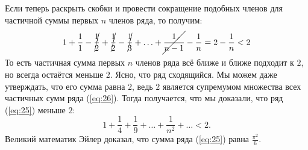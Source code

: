 \documentclass[12pt]{article}
\begin{document}
Если теперь раскрыть скобки и провести сокращение подобных членов для частичной суммы первых $n$ членов ряда, то получим:
\begin{equation}
    \begin{split}
        1 + \dfrac{1}{1} - \cancel{\dfrac{1}{2}} + \cancel{\dfrac{1}{2}}  - \cancel{\dfrac{1}{3}} + \ldots +\cancel{\dfrac{1}{n-1}} - \dfrac{1}{n} = 2 - \dfrac{1}{n} < 2
    \end{split}
\end{equation}
То есть частичная сумма первых $n$ членов ряда всё ближе и ближе подходит к $2$, но всегда остаётся меньше $2$. Ясно, что ряд сходящийся. Мы можем даже утверждать, что его сумма равна $2$, ведь $2$ является супремумом множества всех частичных сумм ряда (\ref{eq:26}). Тогда получается, что мы доказали, что ряд (\ref{eq:25}) меньше $2$:
\begin{equation}
    1 + \dfrac{1}{4} + \dfrac{1}{9} + \ldots + \dfrac{1}{n^2} + \ldots < 2.
\end{equation}
Великий математик Эйлер доказал, что сумма ряда (\ref{eq:25}) равна $\tfrac{\pi^2}{6}$.
\end{document}
